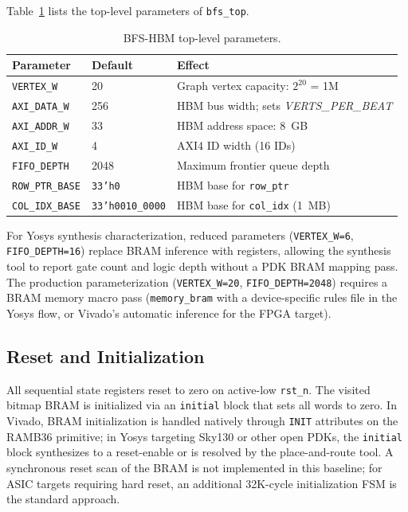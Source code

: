 Table~\ref{tab:params} lists the top-level parameters of \texttt{bfs\_top}.

\begin{table}[h]
\centering
\caption{BFS-HBM top-level parameters.}
\label{tab:params}
\footnotesize
\begin{tabular}{@{}ll>{\raggedright\arraybackslash}p{2.6cm}@{}}
\toprule
Parameter & Default & Effect \\
\midrule
\texttt{VERTEX\_W}    & 20  & Graph vertex capacity: $2^{20}$ = 1M \\
\texttt{AXI\_DATA\_W} & 256 & HBM bus width; sets \textit{VERTS\_PER\_BEAT} \\
\texttt{AXI\_ADDR\_W} & 33  & HBM address space: 8~GB \\
\texttt{AXI\_ID\_W}   & 4   & AXI4 ID width (16 IDs) \\
\texttt{FIFO\_DEPTH}  & 2048 & Maximum frontier queue depth \\
\texttt{ROW\_PTR\_BASE} & \texttt{33'h0} & HBM base for \texttt{row\_ptr} \\
\texttt{COL\_IDX\_BASE} & \texttt{33'h0010\_0000} & HBM base for \texttt{col\_idx} (1~MB) \\
\bottomrule
\end{tabular}
\end{table}

For Yosys synthesis characterization, reduced parameters (\texttt{VERTEX\_W=6},
\texttt{FIFO\_DEPTH=16}) replace BRAM inference with registers, allowing the
synthesis tool to report gate count and logic depth without a PDK BRAM mapping pass.
The production parameterization (\texttt{VERTEX\_W=20}, \texttt{FIFO\_DEPTH=2048})
requires a BRAM memory macro pass (\texttt{memory\_bram} with a device-specific
rules file in the Yosys flow, or Vivado's automatic inference for the FPGA target).

\subsection{Reset and Initialization}

All sequential state registers reset to zero on active-low \texttt{rst\_n}.
The visited bitmap BRAM is initialized via an \texttt{initial} block that sets
all words to zero. In Vivado, BRAM initialization is handled natively through
\texttt{INIT} attributes on the RAMB36 primitive; in Yosys targeting Sky130 or
other open PDKs, the \texttt{initial} block synthesizes to a reset-enable or
is resolved by the place-and-route tool. A synchronous reset scan of the BRAM
is not implemented in this baseline; for ASIC targets requiring hard reset,
an additional 32K-cycle initialization FSM is the standard approach.
